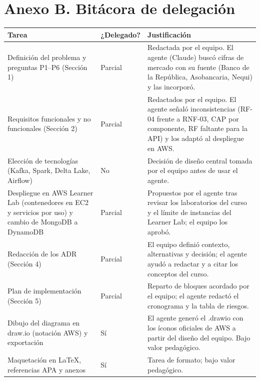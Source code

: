 \documentclass[12pt,letterpaper]{article}
\begin{document}
\section*{Anexo B. Bitácora de delegación}
\begin{footnotesize}
\begin{tabular}{@{}P{2.2in}P{0.85in}P{3.25in}@{}}
\toprule
\textbf{Tarea} & \textbf{¿Delegado?} & \textbf{Justificación}\\
\midrule
Definición del problema y preguntas P1--P6 (Sección 1) & Parcial & Redactada por el equipo. El agente (Claude) buscó cifras de mercado con su fuente (Banco de la República, Asobancaria, Nequi) y las incorporó.\\[1pt]
Requisitos funcionales y no funcionales (Sección 2) & Parcial & Redactados por el equipo. El agente señaló inconsistencias (RF-04 frente a RNF-03, CAP por componente, RF faltante para la API) y los adaptó al despliegue en AWS.\\[1pt]
Elección de tecnologías (Kafka, Spark, Delta Lake, Airflow) & No & Decisión de diseño central tomada por el equipo antes de usar el agente.\\[1pt]
Despliegue en AWS Learner Lab (contenedores en EC2 y servicios por uso) y cambio de MongoDB a DynamoDB & Parcial & Propuestos por el agente tras revisar los laboratorios del curso y el límite de instancias del Learner Lab; el equipo los aprobó.\\[1pt]
Redacción de los ADR (Sección 4) & Parcial & El equipo definió contexto, alternativas y decisión; el agente ayudó a redactar y a citar los conceptos del curso.\\[1pt]
Plan de implementación (Sección 5) & Parcial & Reparto de bloques acordado por el equipo; el agente redactó el cronograma y la tabla de riesgos.\\[1pt]
Dibujo del diagrama en draw.io (notación AWS) y exportación & Sí & El agente generó el .drawio con los íconos oficiales de AWS a partir del diseño del equipo. Bajo valor pedagógico.\\[1pt]
Maquetación en LaTeX, referencias APA y anexos & Sí & Tarea de formato; bajo valor pedagógico.\\[1pt]
\bottomrule
\end{tabular}
\end{footnotesize}
\end{document}
